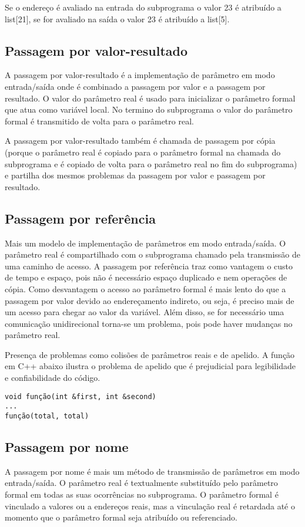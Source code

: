 Se o endereço é avaliado na entrada do subprograma o valor 23 é atribuído a list[21], se for avaliado na saída o valor 23 é atribuído a list[5].


\subsection{Passagem por valor-resultado}
A passagem por valor-resultado é a implementação de parâmetro em modo entrada/saída onde é combinado a passagem por valor e a passagem por resultado. O valor do parâmetro real é usado para inicializar o parâmetro formal que atua como variável local. No termino do subprograma o valor do parâmetro formal é transmitido de volta para o parâmetro real. 

A passagem por valor-resultado também é chamada de passagem por cópia (porque o parâmetro real é copiado para o parâmetro formal na chamada do subprograma e é copiado de volta para o parâmetro real no fim do subprograma) e partilha dos mesmos problemas da passagem por valor e passagem por resultado.

\subsection{Passagem por referência}
Mais um modelo de implementação de parâmetros em modo entrada/saída. O parâmetro real é compartilhado com o subprograma chamado pela transmissão de uma caminho de acesso.
A passagem por referência traz como vantagem o custo de tempo e espaço, pois não é necessário espaço duplicado e nem operações de cópia. Como desvantagem o acesso ao parâmetro formal é mais lento do que a passagem por valor devido ao endereçamento indireto, ou seja, é preciso mais de um acesso para chegar ao valor da variável. Além disso, se for necessário uma comunicação unidirecional torna-se um problema, pois pode haver mudanças no parâmetro real.

Presença de problemas como colisões de parâmetros reais e de apelido. A função em C++ abaixo ilustra o problema de apelido que é prejudicial para legibilidade e confiabilidade do código.

\begin{verbatim}
void função(int &first, int &second)
...
função(total, total)
\end{verbatim}

\subsection{Passagem por nome}
A passagem por nome é mais um método de transmissão de parâmetros em modo entrada/saída. O parâmetro real é textualmente substituído pelo parâmetro formal em todas as suas ocorrências no subprograma. O parâmetro formal é vinculado a valores ou a endereços reais, mas a vinculação real é retardada até o momento que o parâmetro formal seja atribuído ou referenciado.

